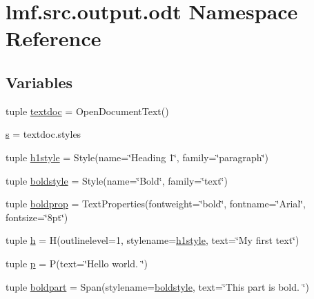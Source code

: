 \hypertarget{namespacelmf_1_1src_1_1output_1_1odt}{\section{lmf.\+src.\+output.\+odt Namespace Reference}
\label{namespacelmf_1_1src_1_1output_1_1odt}
}
\subsection*{Variables}
\begin{DoxyCompactItemize}
\item 
tuple \hyperlink{namespacelmf_1_1src_1_1output_1_1odt_acfe673df400456dbafa6cf3b26a788bd}{textdoc} = Open\+Document\+Text()
\item 
\hyperlink{namespacelmf_1_1src_1_1output_1_1odt_a5de2fbc8864cd6875671cf45d669877a}{s} = textdoc.\+styles
\item 
tuple \hyperlink{namespacelmf_1_1src_1_1output_1_1odt_a42dc5d526d0fc00bb6d63fa261a316d3}{h1style} = Style(name=\char`\"{}Heading 1\char`\"{}, family=\char`\"{}paragraph\char`\"{})
\item 
tuple \hyperlink{namespacelmf_1_1src_1_1output_1_1odt_ae89ed401433d97b22c3a45cd267c6b75}{boldstyle} = Style(name=\char`\"{}Bold\char`\"{}, family=\char`\"{}text\char`\"{})
\item 
tuple \hyperlink{namespacelmf_1_1src_1_1output_1_1odt_a883b09afc4579bcc6f02a3c630ac1aa6}{boldprop} = Text\+Properties(fontweight=\char`\"{}bold\char`\"{}, fontname=\char`\"{}Arial\char`\"{}, fontsize=\char`\"{}8pt\char`\"{})
\item 
tuple \hyperlink{namespacelmf_1_1src_1_1output_1_1odt_a1a55a65013697849c387fde9a56b25ca}{h} = H(outlinelevel=1, stylename=\hyperlink{namespacelmf_1_1src_1_1output_1_1odt_a42dc5d526d0fc00bb6d63fa261a316d3}{h1style}, text=\char`\"{}My first text\char`\"{})
\item 
tuple \hyperlink{namespacelmf_1_1src_1_1output_1_1odt_afa1b5866aef132001690773cb7a63798}{p} = P(text=\char`\"{}Hello world. \char`\"{})
\item 
tuple \hyperlink{namespacelmf_1_1src_1_1output_1_1odt_a191027189751a24a5105e7593a1b7d49}{boldpart} = Span(stylename=\hyperlink{namespacelmf_1_1src_1_1output_1_1odt_ae89ed401433d97b22c3a45cd267c6b75}{boldstyle}, text=\char`\"{}This part is bold. \char`\"{})
\end{DoxyCompactItemize}


